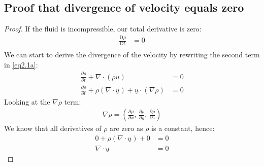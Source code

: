 \documentclass[11pt]{article}
\numberwithin{equation}{section}
\begin{document}
\subsection{Proof that divergence of velocity equals zero}
\begin{proof}
If the fluid is incompressible, our total derivative is zero:
\begin{align}
    \frac{\textrm{D}\rho}{\textrm{D}t} &= 0\\
\end{align}
We can start to derive the divergence of the velocity by rewriting the second term in \ref{eq2.1a}:
\begin{align}
    \frac{\partial \rho}{\partial t} + \nabla \cdot \left(\rho \underline{u}\right) &= 0 \label{eq2.1a}\\ 
    \frac{\partial \rho}{\partial t} + \rho \left(\nabla \cdot \underline{u}\right) + \underline{u} \cdot \left(\nabla \rho\right) &= 0
\end{align}
Looking at the $\nabla \rho$ term:
\begin{align}
    \nabla \rho = \left(\frac{\partial \rho}{\partial x}, \, \frac{\partial \rho}{\partial y}, \, \frac{\partial \rho}{\partial z}\right)
\end{align}
We know that all derivatives of $\rho$ are zero as $\rho$ is a constant, hence:
\begin{align}
    0 + \rho \left(\nabla \cdot \underline{u}\right) + 0 &= 0\\
    \nabla \cdot \underline{u} &= 0
\end{align}
\end{proof}
\end{document}
